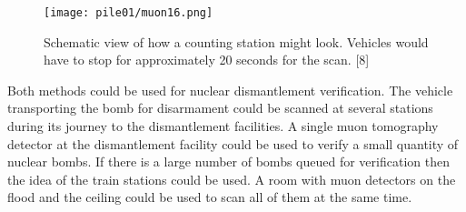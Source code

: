 \documentclass[a4paper]{article}
\begin{document}
\begin{figure}[h!]
  \texttt{[image: pile01/muon16.png]}
  \caption{Schematic view of how a counting station might look. Vehicles would have to stop for
approximately 20 seconds for the scan. [8]}
  \label{muon16}
\end{figure}

Both methods could be used for nuclear dismantlement verification. The vehicle transporting the
bomb for disarmament could be scanned at several stations during its journey to the dismantlement
facilities. A single muon tomography detector at the dismantlement facility could be used to verify a
small quantity of nuclear bombs. If there is a large number of bombs queued for verification then
the idea of the train stations could be used. A room with muon detectors on the flood and the ceiling
could be used to scan all of them at the same time.
\end{document}
